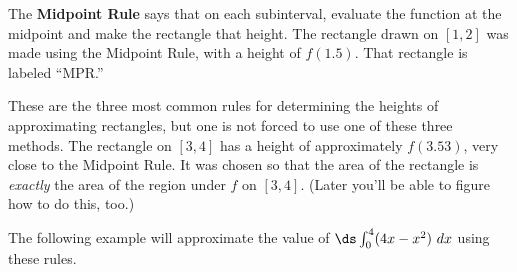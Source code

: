 The \textbf{Midpoint Rule} says that on each subinterval, evaluate the function at the midpoint and make the rectangle that height. The rectangle drawn on $[1,2]$ was made using the Midpoint Rule, with a height of $f(1.5)$. That rectangle is labeled ``MPR.''

These are the three most common rules for determining the heights of approximating rectangles, but one is not forced to use one of these three methods. The rectangle on $[3,4]$ has a height of approximately $f(3.53)$, very close to the Midpoint Rule. It was chosen so that the area of the rectangle is \textit{exactly} the area of the region under $f$ on $[3,4]$. (Later you'll be able to figure how to do this, too.)

The following example will approximate the value of $\ds\int_0^4 (4x-x^2)\ dx$ using these rules.

